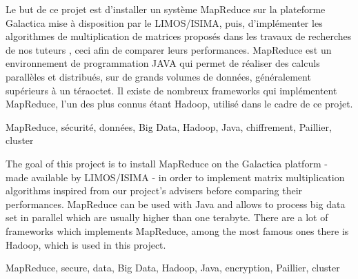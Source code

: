 

Le but de ce projet est d'installer un système MapReduce sur la plateforme Galactica mise
à disposition par le LIMOS/ISIMA, puis, d'implémenter les algorithmes de multiplication de matrices
proposés dans les travaux de recherches de nos tuteurs \cite{publi-tuteurs}, ceci afin de comparer leurs performances.
MapReduce est un environnement de programmation JAVA qui permet de réaliser des calculs parallèles 
et distribués, sur de grands volumes de données, généralement supérieurs à un téraoctet.
Il existe de nombreux frameworks qui implémentent MapReduce, l'un des plus connus étant Hadoop, utilisé dans le cadre de ce projet.

MapReduce, sécurité, données, Big Data, Hadoop, Java, chiffrement, Paillier, cluster


The goal of this project is to install MapReduce on the Galactica platform - made available by LIMOS/ISIMA - in order to implement matrix multiplication algorithms inspired from our project's advisers before comparing their performances. MapReduce can be used with Java and allows to process big data set in parallel which are usually higher than one terabyte. There are a lot of frameworks which implements MapReduce, among the most famous ones there is Hadoop, which is used in this project.

MapReduce, secure, data, Big Data, Hadoop, Java, encryption, Paillier, cluster

